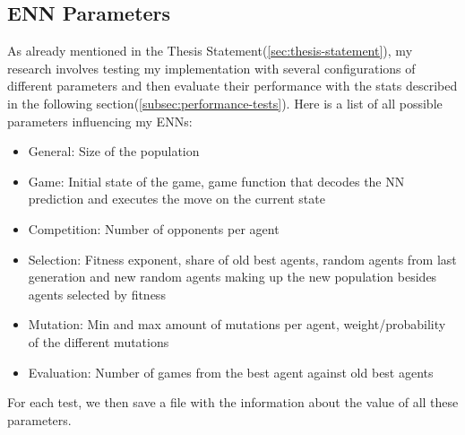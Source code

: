 \documentclass[11pt]{report}
\begin{document}
\begin{enumerate}
            \subsection{ENN Parameters}\label{subsec:enn-parameters}
    As already mentioned in the Thesis Statement(\ref{sec:thesis-statement}), my research involves testing my implementation with several configurations of different parameters and then evaluate their performance with the stats described in the following section(\ref{subsec:performance-tests}).
    Here is a list of all possible parameters influencing my ENNs:
    \begin{itemize}
        \item General: Size of the population
        \item Game: Initial state of the game, game function that decodes the NN prediction and executes the move on the current state
        \item Competition: Number of opponents per agent
        \item Selection: Fitness exponent, share of old best agents, random agents from last generation and new random agents making up the new population besides agents selected by fitness
        \item Mutation: Min and max amount of mutations per agent, weight/probability of the different mutations
        \item Evaluation: Number of games from the best agent against old best agents
    \end{itemize}
    For each test, we then save a file with the information about the value of all these parameters.


\end{enumerate}
\end{document}
